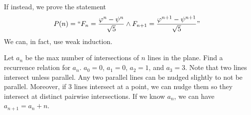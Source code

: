 \begin{remark}
    If instead, we prove the statement
    $$
    P(n) = ``F_n = \frac{\varphi^n - \psi^n}{\sqrt{5}} \land F_{n+1} = \frac{\varphi^{n+1}-\psi^{n+1}}{\sqrt{5}}"
    $$
    We can, in fact, use weak induction.
\end{remark}

Let $a_n$ be the max number of intersections of $n$ lines in the plane. Find a recurrence relation for $a_n$. $a_0 = 0$, $a_1 = 0$, $a_2 = 1$, and $a_3 = 3$. Note that two lines intersect unless parallel. Any two parallel lines can be nudged slightly to not be parallel. Moreover, if 3 lines intersect at a point, we can nudge them so they intersect at distinct pairwise intersections. If we know $a_n$, we can have $a_{n+1} = a_n + n$.